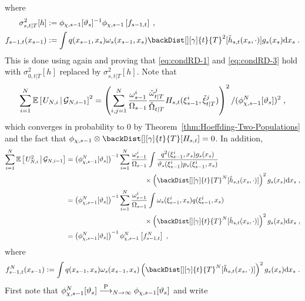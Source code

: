 where
\begin{align*}
\sigma^2_{s,t|T}[h] &\eqdef \filt{\chi,s-1}[\adjfuncforward{s}]^{-1}\filt{\Xinit,s-1}\left[f_{s-1,t}\right]\eqsp,\\
f_{s-1,t}(x_{s-1}) &\eqdef \int q(x_{s-1},x_s)\ewghtfunc{s}(x_{s-1},x_s)
\backDist[][\gamma]{t}{T}^2[\tilde{h}_{s,t}(x_s,\cdot)] g_ s(x_s)\rmd x_s\eqsp.
\end{align*}
This is done using again \cite[Theorem~A.3]{douc:moulines:2008} and proving that \eqref{eq:condRD-1} and \eqref{eq:condRD-3} hold with $\sigma^2_{0,t|T}[h]$ replaced by $\sigma^2_{s,t|T}[h]$. Note that
\begin{equation*}
 \sum_{i=1}^N \CPE{U_{N,i}}{\mcg{N,i-1}}^2= \left(\sum_{i, j=1}^N\frac{\swght{s-1}{i}}{\sumwght{s-1}}\frac{\ebackwght{t}{T}{j}}{\backsumwght{t}{T}} H_{s,t}(\epartpred{s-1}{i}, \ebackpart{t}{T}{j})\right)^2/(\filt{\chi,s-1}^N[\adjfuncforward{s}])^2 \eqsp,
\end{equation*}
which converges in probability to $0$ by Theorem~\ref{thm:Hoeffding-Two-Populations} and the fact that $\filt{\chi,s-1}\otimes \backDist[][\gamma]{t}{T}[H_{s,t}]=0$. In addition,
\begin{align*}
\sum_{i=1}^N \CPE{U_{N,i}^2}{\mcg{N,i-1}}&= \left(\filt{\chi,s-1}^N[\adjfuncforward{s}]\right)^{-1}\sum_{i=1}^N\frac{\ewght{s-1}{i}}{\sumwght{s-1}}\int  \frac{q^2(\epart{s-1}{i}, x_{s}) g_s(x_s)}{\adjfuncforward{s}(\epart{s-1}{i})\kissforward{s}{s}(\epart{s-1}{i},x_s)} \\
&\hspace{4cm}\times \left(\backDist[][\gamma]{t}{T}^N[\tilde{h}_{s,t}(x_s,\cdot)]\right)^2 g_s(x_s) \rmd x_s\eqsp,\\
 &= \left(\filt{\chi,s-1}^N[\adjfuncforward{s}]\right)^{-1}\sum_{i=1}^N\frac{\ewght{s-1}{i}}{\sumwght{s-1}}\int  \ewghtfunc{s}(\epart{s-1}{i},x_s)q(\epart{s-1}{i}, x_{s}) \\
&\hspace{4cm}\times \left(\backDist[][\gamma]{t}{T}^N[\tilde{h}_{s,t}(x_s,\cdot)]\right)^2 g_s(x_s) \rmd x_s\eqsp,\\
&=\left(\filt{\chi,s-1}^N[\adjfuncforward{s}]\right)^{-1}\filt{\Xinit,s-1}^N\left[ f_{s-1,t}^N\right]\eqsp,
\end{align*}
where
\[
f_{s-1,t}^N(x_{s-1}) \eqdef \int q(x_{s-1},x_s)\ewghtfunc{s}(x_{s-1},x_s)
\left(\backDist[][\gamma]{t}{T}^N[\tilde{h}_{s,t}(x_s,\cdot)]\right)^2 g_ s(x_s)\rmd x_s\eqsp.
\]
First note that $\filt{\chi,s-1}^N[\adjfuncforward{s}]\plim_{N \to \infty}\filt{\chi,s-1}[\adjfuncforward{s}]$ and write
